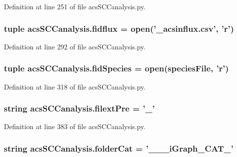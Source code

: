 Definition at line 251 of file acs\-S\-C\-Canalysis.\-py.

\hypertarget{a00128_a0c40e4d9928e8df792b31c7a431d3fba}{
\subsubsection[{fidflux}]{\setlength{\rightskip}{0pt plus 5cm}tuple acs\-S\-C\-Canalysis.\-fidflux = open('\-\_\-acsinflux.\-csv', '{\bf r}')}}\label{a00128_a0c40e4d9928e8df792b31c7a431d3fba}


Definition at line 292 of file acs\-S\-C\-Canalysis.\-py.

\hypertarget{a00128_aba2f982879776e057b35971b3653549e}{
\subsubsection[{fid\-Species}]{\setlength{\rightskip}{0pt plus 5cm}tuple acs\-S\-C\-Canalysis.\-fid\-Species = open({\bf species\-File}, '{\bf r}')}}\label{a00128_aba2f982879776e057b35971b3653549e}


Definition at line 318 of file acs\-S\-C\-Canalysis.\-py.

\hypertarget{a00128_a60ff937c050eef601bd84134d1913d8a}{
\subsubsection[{filext\-Pre}]{\setlength{\rightskip}{0pt plus 5cm}string acs\-S\-C\-Canalysis.\-filext\-Pre = '\-\_\-'}}\label{a00128_a60ff937c050eef601bd84134d1913d8a}


Definition at line 383 of file acs\-S\-C\-Canalysis.\-py.

\hypertarget{a00128_a1cbfd083273176eebfe0260e8384acef}{
\subsubsection[{folder\-Cat}]{\setlength{\rightskip}{0pt plus 5cm}string acs\-S\-C\-Canalysis.\-folder\-Cat = '\-\_\-\-\_\-\_\-i\-Graph\-\_\-\-C\-A\-T\-\_\-'}}\label{a00128_a1cbfd083273176eebfe0260e8384acef}


